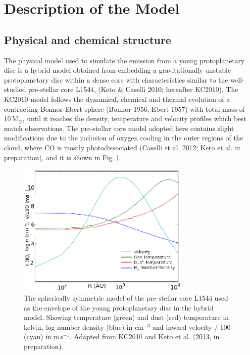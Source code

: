 \documentclass[useAMS,usenatbib]{mn2e}
\begin{document}
\section{Description of the Model} \label{sec:description_model}

\subsection{Physical and chemical structure} \label{subsec:physical_structure}


The physical model used to simulate the emission from a young protoplanetary disc is a hybrid model obtained from embedding a gravitationally unstable protoplanetary disc  within a dense core with characteristics similar to the well-studied pre-stellar core L1544, (Keto \& Caselli 2010; hereafter KC2010). The KC2010 model follows the dynamical, chemical and thermal evolution of a contracting Bonnor-Ebert sphere (Bonnor 1956; Ebert 1957) with total mass of 10\,M$_{\odot}$, until it reaches the density, temperature and velocity profiles which best match observations. The pre-stellar core model adopted here contains slight modifications due to the inclusion of oxygen cooling in the outer regions of the cloud, where CO is mostly photodissociated (Caselli et al. 2012; Keto et al. in preparation), and it is shown in Fig.\,\ref{fig:l1544_model}. \newline

\begin{figure}
 \includegraphics[width=84mm]{Figures/model/L1544model_used_legend_small.eps}
 \caption{The spherically symmetric model of the pre-stellar core L1544 used as the envelope of the young protoplanetary disc in the hybrid model. Showing temperature (green) and dust (red) temperature in kelvin, log number density (blue) in cm$^{-3}$ and inward velocity / 100 (cyan) in m$\,$s$^{-1}$. Adapted from KC2010 and Keto et al. (2013, in preparation).}
 \label{fig:l1544_model}
\end{figure}
\end{document}
